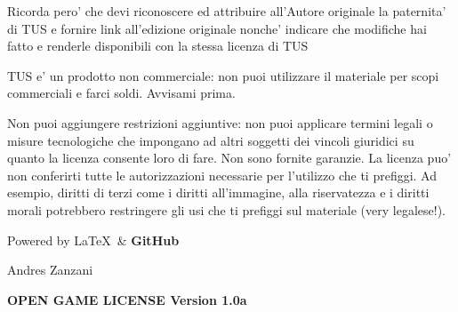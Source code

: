 \documentclass[a4paper,11pt,twoside,openany]{book}
\begin{document}
{		Ricorda pero' che devi riconoscere ed attribuire all'Autore originale la paternita' di TUS e fornire link all'edizione originale nonche' indicare che modifiche hai fatto e renderle disponibili con la stessa licenza di TUS
		
		\bigskip
		TUS e' un prodotto non commerciale: non puoi utilizzare il materiale per scopi commerciali e farci soldi. Avvisami prima.
		
		\bigskip
		Non puoi aggiungere restrizioni aggiuntive: non puoi applicare termini legali o misure tecnologiche che impongano ad altri soggetti dei vincoli giuridici su quanto la licenza consente loro di fare. Non sono fornite garanzie. La licenza puo' non conferirti tutte le autorizzazioni necessarie per l'utilizzo che ti prefiggi. Ad esempio, diritti di terzi come i diritti all'immagine, alla riservatezza e i diritti morali potrebbero restringere gli usi che ti prefiggi sul materiale (very legalese!).
		
		\bigskip
		
		Powered by \Large\LaTeX\ \normalfont\& \Large\textbf{GitHub}
		
		\bigskip
		
		Andres Zanzani
		
		
		\normalsize
		
		\pagebreak
		
		{\footnotesize
			\textbf{OPEN GAME LICENSE Version 1.0a}
			
}}
\end{document}
